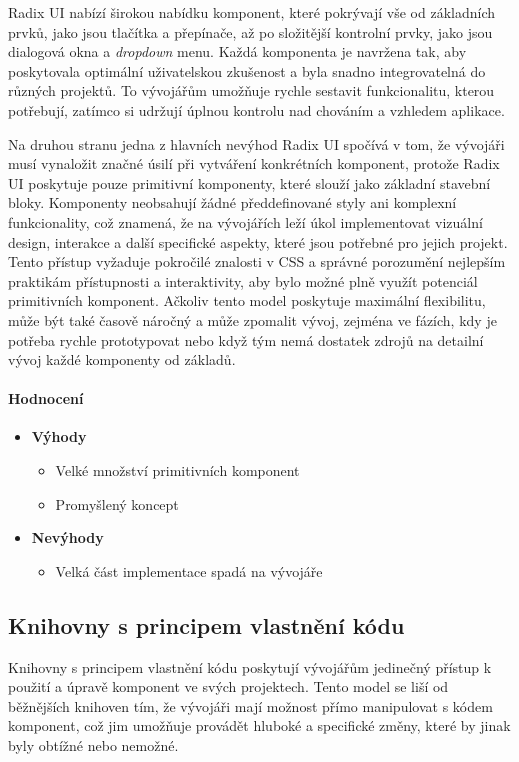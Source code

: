 Radix UI nabízí širokou nabídku komponent, které pokrývají vše od základních prvků, jako jsou tlačítka a přepínače, až po složitější kontrolní prvky, jako jsou dialogová okna a \emph{dropdown} menu. Každá komponenta je navržena tak, aby poskytovala optimální uživatelskou zkušenost a byla snadno integrovatelná do různých projektů. To vývojářům umožňuje rychle sestavit funkcionalitu, kterou potřebují, zatímco si udržují úplnou kontrolu nad chováním a vzhledem aplikace.

Na druhou stranu jedna z hlavních nevýhod Radix UI spočívá v tom, že vývojáři musí vynaložit značné úsilí při vytváření konkrétních komponent, protože Radix UI poskytuje pouze primitivní komponenty, které slouží jako základní stavební bloky. Komponenty neobsahují žádné předdefinované styly ani komplexní funkcionality, což znamená, že na vývojářích leží úkol implementovat vizuální design, interakce a další specifické aspekty, které jsou potřebné pro jejich projekt. Tento přístup vyžaduje pokročilé znalosti v CSS a správné porozumění nejlepším praktikám přístupnosti a interaktivity, aby bylo možné plně využít potenciál primitivních komponent. Ačkoliv tento model poskytuje maximální flexibilitu, může být také časově náročný a může zpomalit vývoj, zejména ve fázích, kdy je potřeba rychle prototypovat nebo když tým nemá dostatek zdrojů na detailní vývoj každé komponenty od základů.

\paragraph{Hodnocení}

\begin{itemize}
    \item \textbf{Výhody}
    \begin{itemize}
        \item Velké množství primitivních komponent
        \item Promyšlený koncept
    \end{itemize}
    \item \textbf{Nevýhody}
    \begin{itemize}
        \item Velká část implementace spadá na vývojáře
    \end{itemize}
\end{itemize}

\subsection{Knihovny s principem vlastnění kódu}
Knihovny s principem vlastnění kódu poskytují vývojářům jedinečný přístup k použití a úpravě komponent ve svých projektech. Tento model se liší od běžnějších knihoven tím, že vývojáři mají možnost přímo manipulovat s kódem komponent, což jim umožňuje provádět hluboké a specifické změny, které by jinak byly obtížné nebo nemožné.


